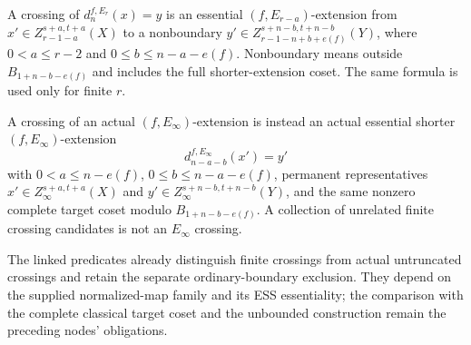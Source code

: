\begin{definition}
  \label{def:page-extension-crossing}
  \notready
  A crossing of $d_n^{f,E_r}(x)=y$ is an essential
  $(f,E_{r-a})$-extension from
  $x'\in Z_{r-1-a}^{s+a,t+a}(X)$ to a nonboundary
  $y'\in Z_{r-1-n+b+e(f)}^{s+n-b,t+n-b}(Y)$, where
  $0<a\le r-2$ and $0\le b\le n-a-e(f)$.  Nonboundary means outside
  $B_{1+n-b-e(f)}$ and includes the full shorter-extension coset.  The same
  formula is used only for finite $r$.

  A crossing of an actual $(f,E_\infty)$-extension is instead an actual
  essential shorter $(f,E_\infty)$-extension
  \[
    d_{n-a-b}^{f,E_\infty}(x')=y'
  \]
  with $0<a\le n-e(f)$, $0\le b\le n-a-e(f)$, permanent representatives
  $x'\in Z_\infty^{s+a,t+a}(X)$ and
  $y'\in Z_\infty^{s+n-b,t+n-b}(Y)$, and the same nonzero complete target
  coset modulo $B_{1+n-b-e(f)}$.  A collection of unrelated finite crossing
  candidates is not an $E_\infty$ crossing.

  The linked predicates already distinguish finite crossings from actual
  untruncated crossings and retain the separate ordinary-boundary exclusion.
  They depend on the supplied normalized-map family and its ESS essentiality;
  the comparison with the complete classical target coset and the unbounded
  construction remain the preceding nodes' obligations.
\end{definition}
